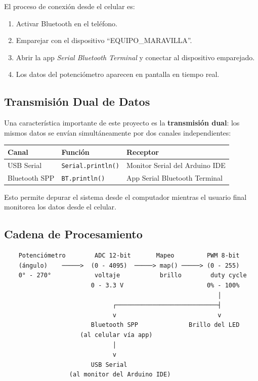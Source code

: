 \documentclass[12pt,a4paper]{article}
\begin{document}
El proceso de conexión desde el celular es:
\begin{enumerate}
    \item Activar Bluetooth en el teléfono.
    \item Emparejar con el dispositivo ``EQUIPO\_MARAVILLA''.
    \item Abrir la app \textit{Serial Bluetooth Terminal} y conectar al dispositivo emparejado.
    \item Los datos del potenciómetro aparecen en pantalla en tiempo real.
\end{enumerate}

\subsection{Transmisión Dual de Datos}

Una característica importante de este proyecto es la \textbf{transmisión dual}: los mismos datos se envían simultáneamente por dos canales independientes:

\begin{center}
\begin{tabular}{lll}
\toprule
\textbf{Canal} & \textbf{Función} & \textbf{Receptor} \\
\midrule
USB Serial & \texttt{Serial.println()} & Monitor Serial del Arduino IDE \\
Bluetooth SPP & \texttt{BT.println()} & App Serial Bluetooth Terminal \\
\bottomrule
\end{tabular}
\end{center}

Esto permite depurar el sistema desde el computador mientras el usuario final monitorea los datos desde el celular.

\subsection{Cadena de Procesamiento}

\begin{verbatim}
    Potenciómetro        ADC 12-bit       Mapeo         PWM 8-bit
    (ángulo)    ─────>  (0 - 4095)  ─────> map() ─────> (0 - 255)
    0° - 270°            voltaje           brillo        duty cycle
                        0 - 3.3 V                       0% - 100%
                                                           │
                              ┌────────────────────────────┤
                              v                            v
                        Bluetooth SPP              Brillo del LED
                     (al celular vía app)
                              │
                              v
                        USB Serial
                  (al monitor del Arduino IDE)
\end{verbatim}
\end{document}
